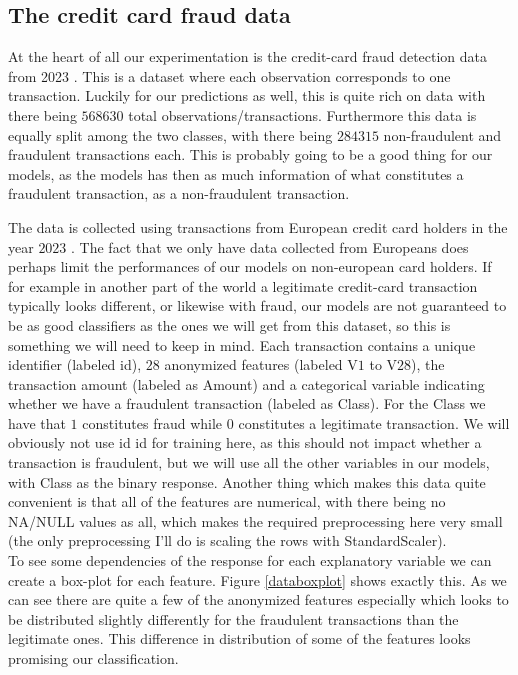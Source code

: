 \documentclass{article}
\begin{document}
\subsection{The credit card fraud data}
At the heart of all our experimentation is the credit-card fraud detection
data from 2023 \cite{kaggleccdata}. This is a dataset where each observation
corresponds to one transaction. Luckily for our predictions as well, this is
quite rich on data with there being $568630$ total observations/transactions.
Furthermore this data is equally split among the two classes, with there being
$284315$ non-fraudulent and fraudulent transactions each. This is probably
going to be a good thing for our models, as the models has then as much
information of what constitutes a fraudulent transaction, as a non-fraudulent
transaction.

The data is collected using transactions from European credit card holders in
the year $2023$ \cite{kaggleccdata}. The fact that we only have data collected
from Europeans does perhaps limit the performances of our models on
non-european card holders. If for example in another part of the world a
legitimate credit-card transaction typically looks different, or likewise with
fraud, our models are not guaranteed to be as good classifiers as the ones we
will get from this dataset, so this is something we will need to keep in mind.
Each transaction contains a unique identifier (labeled id), $28$ anonymized
features (labeled $\text{V}1$ to $\text{V}28$), the transaction amount (labeled
as Amount) and a categorical variable indicating whether we have a fraudulent
transaction (labeled as Class). For the Class we have that $1$ constitutes
fraud while $0$ constitutes a legitimate transaction. We will obviously not use
id id for training here, as this should not impact whether a transaction is
fraudulent, but we will use all the other variables in our models, with Class
as the binary response. Another thing which makes this data quite convenient is
that all of the features are numerical, with there being no NA/NULL values as
all, which makes the required preprocessing here very small (the only
preprocessing I'll do is scaling the rows with StandardScaler).
\\

To see some dependencies of the response for each explanatory variable we can
create a box-plot for each feature. Figure \ref{databoxplot} shows exactly
this. As we can see there are quite a few of the anonymized features especially
which looks to be distributed slightly differently for the fraudulent
transactions than the legitimate ones. This difference in distribution of some
of the features looks promising our classification.
\end{document}
